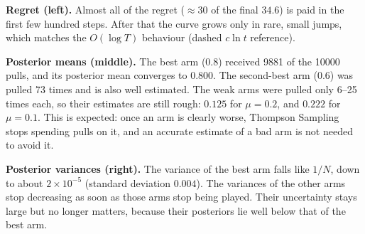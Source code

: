 \documentclass[12pt,a4paper]{article}
\begin{document}
\textbf{Regret (left).} Almost all of the regret ($\approx 30$ of the final $34.6$) is paid in the first few hundred steps.
After that the curve grows only in rare, small jumps, which matches the $O(\log T)$ behaviour (dashed $c\ln t$ reference).

\textbf{Posterior means (middle).} The best arm (0.8) received 9881 of the 10000 pulls, and its posterior mean converges to $0.800$.
The second-best arm (0.6) was pulled 73 times and is also well estimated.
The weak arms were pulled only 6--25 times each, so their estimates are still rough: $0.125$ for $\mu=0.2$, and $0.222$ for $\mu=0.1$.
This is expected: once an arm is clearly worse, Thompson Sampling stops spending pulls on it, and an accurate estimate of a bad arm is not needed to avoid it.

\textbf{Posterior variances (right).} The variance of the best arm falls like $1/N$, down to about $2\times10^{-5}$ (standard deviation $0.004$).
The variances of the other arms stop decreasing as soon as those arms stop being played.
Their uncertainty stays large but no longer matters, because their posteriors lie well below that of the best arm.
\end{document}
